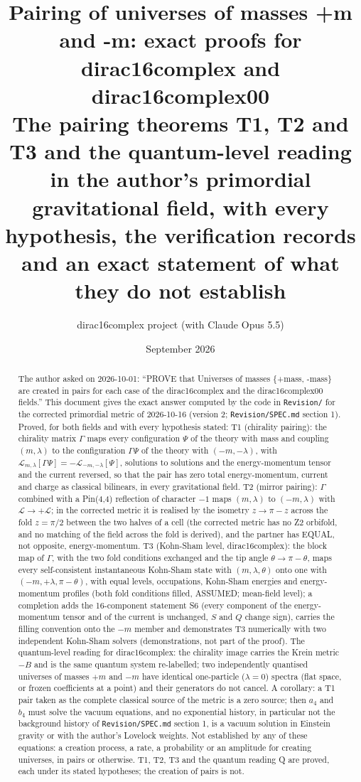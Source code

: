 \documentclass[11pt]{article}
\title{Pairing of universes of masses +m and -m: exact proofs for dirac16complex and dirac16complex00\\[0.5em]\large The pairing theorems T1, T2 and T3 and the quantum-level reading in the author's primordial gravitational field, with every hypothesis, the verification records and an exact statement of what they do not establish}
\author{dirac16complex project (with Claude Opus 5.5)}
\date{September 2026}
\begin{document}
\maketitle
\tableofcontents
\newpage
\begin{abstract}
The author asked on 2026-10-01: ``PROVE that Universes of masses \{+mass, -mass\} are created in pairs for each case of the dirac16complex and the dirac16complex00 fields.'' This document gives the exact answer computed by the code in \texttt{Revision\allowbreak{}/} for the corrected primordial metric of 2026-10-16 (version 2; \texttt{Revision\allowbreak{}/SPEC.md} section 1). Proved, for both fields and with every hypothesis stated: T1 (chirality pairing): the chirality matrix $\Gamma$ maps every configuration $\Psi$ of the theory with mass and coupling $(m,\lambda)$ to the configuration $\Gamma\Psi$ of the theory with $(-m,-\lambda)$, with $\mathcal{L}_{m,\lambda}[\Gamma\Psi] = -\mathcal{L}_{-m,-\lambda}[\Psi]$, solutions to solutions and the energy-momentum tensor and the current reversed, so that the pair has zero total energy-momentum, current and charge as classical bilinears, in every gravitational field. T2 (mirror pairing): $\Gamma$ combined with a Pin(4,4) reflection of character $-1$ maps $(m,\lambda)$ to $(-m,\lambda)$ with $\mathcal{L} \to +\mathcal{L}$; in the corrected metric it is realised by the isometry $z \to \pi - z$ across the fold $z = \pi/2$ between the two halves of a cell (the corrected metric has no Z2 orbifold, and no matching of the field across the fold is derived), and the partner has EQUAL, not opposite, energy-momentum. T3 (Kohn-Sham level, dirac16complex): the block map of $\Gamma$, with the two fold conditions exchanged and the tip angle $\theta \to \pi - \theta$, maps every self-consistent instantaneous Kohn-Sham state with $(m,\lambda,\theta)$ onto one with $(-m,+\lambda,\pi-\theta)$, with equal levels, occupations, Kohn-Sham energies and energy-momentum profiles (both fold conditions filled, ASSUMED; mean-field level); a completion adds the 16-component statement S6 (every component of the energy-momentum tensor and of the current is unchanged, $S$ and $Q$ change sign), carries the filling convention onto the $-m$ member and demonstrates T3 numerically with two independent Kohn-Sham solvers (demonstrations, not part of the proof). The quantum-level reading for dirac16complex: the chirality image carries the Krein metric $-B$ and is the same quantum system re-labelled; two independently quantised universes of masses $+m$ and $-m$ have identical one-particle ($\lambda = 0$) spectra (flat space, or frozen coefficients at a point) and their generators do not cancel. A corollary: a T1 pair taken as the complete classical source of the metric is a zero source; then $a_4$ and $b_4$ must solve the vacuum equations, and no exponential history, in particular not the background history of \texttt{Revision\allowbreak{}/SPEC.md} section 1, is a vacuum solution in Einstein gravity or with the author's Lovelock weights. Not established by any of these equations: a creation process, a rate, a probability or an amplitude for creating universes, in pairs or otherwise. T1, T2, T3 and the quantum reading Q are proved, each under its stated hypotheses; the creation of pairs is not.


\end{abstract}
\end{document}
